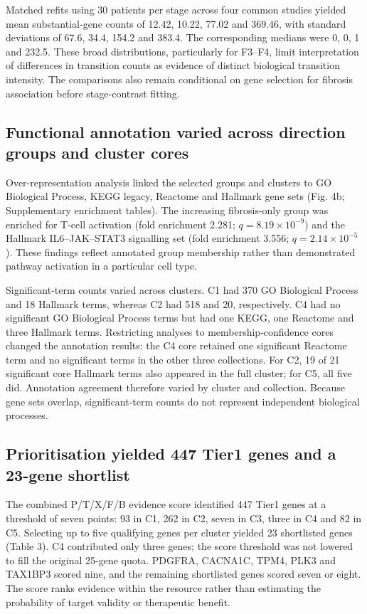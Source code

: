 \documentclass[11pt,a4paper]{article}
\begin{document}
Matched refits using 30 patients per stage across four common studies yielded mean substantial-gene counts of 12.42, 10.22, 77.02 and 369.46, with standard deviations of 67.6, 34.4, 154.2 and 383.4. The corresponding medians were 0, 0, 1 and 232.5. These broad distributions, particularly for F3–F4, limit interpretation of differences in transition counts as evidence of distinct biological transition intensity. The comparisons also remain conditional on gene selection for fibrosis association before stage-contrast fitting.

\subsection*{Functional annotation varied across direction groups and cluster cores}
Over-representation analysis linked the selected groups and clusters to GO Biological Process, KEGG legacy, Reactome and Hallmark gene sets (Fig. 4b; Supplementary enrichment tables). The increasing fibrosis-only group was enriched for T-cell activation (fold enrichment 2.281; \(q=8.19\times10^{-9}\)) and the Hallmark IL6–JAK–STAT3 signalling set (fold enrichment 3.556; \(q=2.14\times10^{-5}\)). These findings reflect annotated group membership rather than demonstrated pathway activation in a particular cell type.

Significant-term counts varied across clusters. C1 had 370 GO Biological Process and 18 Hallmark terms, whereas C2 had 518 and 20, respectively. C4 had no significant GO Biological Process terms but had one KEGG, one Reactome and three Hallmark terms. Restricting analyses to membership-confidence cores changed the annotation results: the C4 core retained one significant Reactome term and no significant terms in the other three collections. For C2, 19 of 21 significant core Hallmark terms also appeared in the full cluster; for C5, all five did. Annotation agreement therefore varied by cluster and collection. Because gene sets overlap, significant-term counts do not represent independent biological processes.

\subsection*{Prioritisation yielded 447 Tier1 genes and a 23-gene shortlist}
The combined P/T/X/F/B evidence score identified 447 Tier1 genes at a threshold of seven points: 93 in C1, 262 in C2, seven in C3, three in C4 and 82 in C5. Selecting up to five qualifying genes per cluster yielded 23 shortlisted genes (Table 3). C4 contributed only three genes; the score threshold was not lowered to fill the original 25-gene quota. PDGFRA, CACNA1C, TPM4, PLK3 and TAX1BP3 scored nine, and the remaining shortlisted genes scored seven or eight. The score ranks evidence within the resource rather than estimating the probability of target validity or therapeutic benefit.
\end{document}
